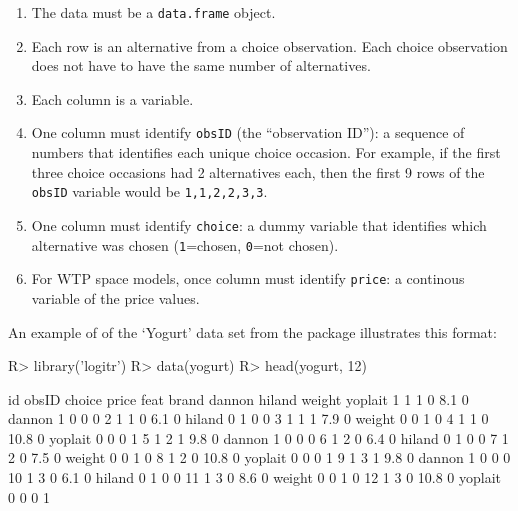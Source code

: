 \documentclass[article]{jss}
\providecommand{\tightlist}{%
  \setlength{\itemsep}{0pt}\setlength{\parskip}{0pt}}
\begin{document}
\begin{enumerate}
\def\labelenumi{\arabic{enumi}.}
\tightlist
\item
  The data must be a \texttt{data.frame} object.
\item
  Each row is an alternative from a choice observation. Each choice
  observation does not have to have the same number of alternatives.
\item
  Each column is a variable.
\item
  One column must identify \texttt{obsID} (the ``observation ID''): a
  sequence of numbers that identifies each unique choice occasion. For
  example, if the first three choice occasions had 2 alternatives each,
  then the first 9 rows of the \texttt{obsID} variable would be
  \texttt{1,1,2,2,3,3}.
\item
  One column must identify \texttt{choice}: a dummy variable that
  identifies which alternative was chosen (\texttt{1}=chosen,
  \texttt{0}=not chosen).
\item
  For WTP space models, once column must identify \texttt{price}: a
  continous variable of the price values.
\end{enumerate}

An example of of the `Yogurt' data set from the  package
illustrates this format:

\begin{CodeChunk}

\begin{CodeInput}
R> library('logitr')
R> data(yogurt)
R> head(yogurt, 12)
\end{CodeInput}

\begin{CodeOutput}
   id obsID choice price feat   brand dannon hiland weight yoplait
1   1     1      0   8.1    0  dannon      1      0      0       0
2   1     1      0   6.1    0  hiland      0      1      0       0
3   1     1      1   7.9    0  weight      0      0      1       0
4   1     1      0  10.8    0 yoplait      0      0      0       1
5   1     2      1   9.8    0  dannon      1      0      0       0
6   1     2      0   6.4    0  hiland      0      1      0       0
7   1     2      0   7.5    0  weight      0      0      1       0
8   1     2      0  10.8    0 yoplait      0      0      0       1
9   1     3      1   9.8    0  dannon      1      0      0       0
10  1     3      0   6.1    0  hiland      0      1      0       0
11  1     3      0   8.6    0  weight      0      0      1       0
12  1     3      0  10.8    0 yoplait      0      0      0       1
\end{CodeOutput}
\end{CodeChunk}
\end{document}
